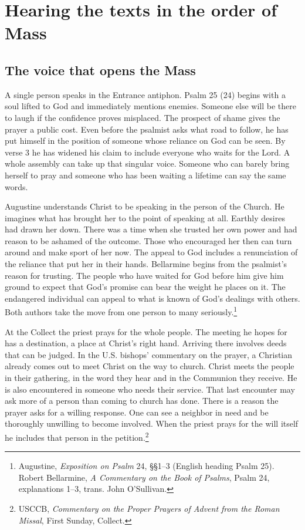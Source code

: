 \section{Hearing the texts in the order of Mass}

\subsection{The voice that opens the Mass}

A single person speaks in the Entrance antiphon. Psalm 25 (24) begins with a soul lifted to God and immediately mentions enemies. Someone else will be there to laugh if the confidence proves misplaced. The prospect of shame gives the prayer a public cost. Even before the psalmist asks what road to follow, he has put himself in the position of someone whose reliance on God can be seen. By verse 3 he has widened his claim to include everyone who waits for the Lord. A whole assembly can take up that singular voice. Someone who can barely bring herself to pray and someone who has been waiting a lifetime can say the same words.

Augustine understands Christ to be speaking in the person of the Church. He imagines what has brought her to the point of speaking at all. Earthly desires had drawn her down. There was a time when she trusted her own power and had reason to be ashamed of the outcome. Those who encouraged her then can turn around and make sport of her now. The appeal to God includes a renunciation of the reliance that put her in their hands. Bellarmine begins from the psalmist's reason for trusting. The people who have waited for God before him give him ground to expect that God's promise can bear the weight he places on it. The endangered individual can appeal to what is known of God's dealings with others. Both authors take the move from one person to many seriously.\footnote{Augustine, \textit{Exposition on Psalm} 24, §§1--3 (English heading Psalm 25). Robert Bellarmine, \textit{A Commentary on the Book of Psalms}, Psalm 24, explanations 1--3, trans. John O'Sullivan.}

At the Collect the priest prays for the whole people. The meeting he hopes for has a destination, a place at Christ's right hand. Arriving there involves deeds that can be judged. In the U.S. bishops' commentary on the prayer, a Christian already comes out to meet Christ on the way to church. Christ meets the people in their gathering, in the word they hear and in the Communion they receive. He is also encountered in someone who needs their service. That last encounter may ask more of a person than coming to church has done. There is a reason the prayer asks for a willing response. One can see a neighbor in need and be thoroughly unwilling to become involved. When the priest prays for the will itself he includes that person in the petition.\footnote{USCCB, \textit{Commentary on the Proper Prayers of Advent from the Roman Missal}, First Sunday, Collect.}

